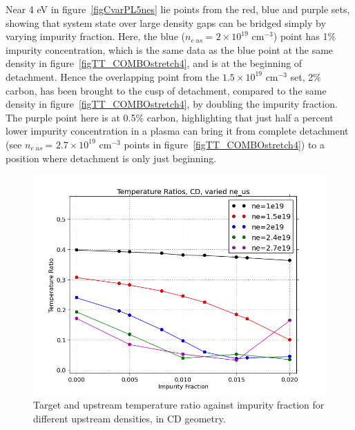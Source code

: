 \documentclass[12pt]{article}  %
\providecommand{\noNe}[1]{{${#1}\times 10^{19}$ cm$^{-3}$}} %
\providecommand{\neus}{$n_{e~us}~$} %
\begin{document}
Near 4 eV in figure~\ref{figCvarPL5nes} lie points from the red, blue and purple sets, showing that system state over large density gaps can be bridged simply by varying impurity fraction. Here, the blue (\neus = \noNe{2}) point has 1\% impurity concentration, which is the same data as the blue point at the same density in figure~\ref{figTT_COMBOstretch4}, and is at the beginning of detachment. Hence the overlapping point from the \noNe{1.5} set, 2\% carbon, has been brought to the cusp of detachment, compared to the same density in figure~\ref{figTT_COMBOstretch4}, by doubling the impurity fraction. The purple point here is at 0.5\% carbon, highlighting that just half a percent lower impurity concentration in a plasma can bring it from complete detachment (see \neus = \noNe{2.7} points in figure~\ref{figTT_COMBOstretch4}) to a position where detachment is only just beginning.

\begin{figure}
\includegraphics[scale=0.5]{Figures/sol1d/CvarTR5nes.png}
\centering
\caption{Target and upstream temperature ratio against impurity fraction for different upstream densities, in CD geometry.}\label{figCvarTR5nes}
\end{figure}
\end{document}
